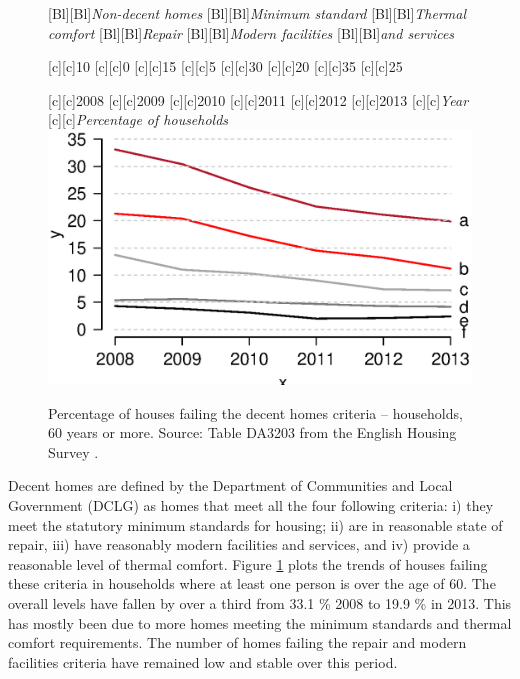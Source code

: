 \documentclass[11 pt, a4paper]{report}
\begin{document}
\begin{figure}[hbtp!]
[Bl][Bl]{\emph{Non-decent homes}}
[Bl][Bl]{\emph{Minimum standard}}
[Bl][Bl]{\emph{Thermal comfort}}
[Bl][Bl]{\emph{Repair}}
[Bl][Bl]{\emph{Modern facilities}}
[Bl][Bl]{\emph{and services}}

[c][c]{\small{10}}
[c][c]{\small{0}}
[c][c]{\small{15}}
[c][c]{\small{5}}
[c][c]{\small{30}}
[c][c]{\small{20}}
[c][c]{\small{35}}
[c][c]{\small{25}}

[c][c]{\small{2008}}
[c][c]{\small{2009}}
[c][c]{\small{2010}}
[c][c]{\small{2011}}
[c][c]{\small{2012}}
[c][c]{\small{2013}}
[c][c]{\small{\emph{Year}}}
[c][c]{\small{\emph{Percentage of households}}}
\includegraphics[width=\textwidth]{../figures/Fig6.3.eps}
\caption{Percentage of houses failing the decent homes criteria – households, 60 years or more. Source: Table DA3203 from the English Housing Survey \citep{DCLG2013}.}\label{Fig:18} %
\end{figure}

Decent homes are defined by the Department of Communities and Local Government (DCLG) as homes that meet all the four following criteria: i) they meet the statutory minimum standards for housing; ii) are in reasonable state of repair, iii) have reasonably modern facilities and services, and iv) provide a reasonable level of thermal comfort. Figure \ref{Fig:18} plots the trends of houses failing these criteria in households where at least one person is over the age of 60. The overall levels have fallen by over a third from 33.1 \% 2008 to 19.9 \% in 2013. This has mostly been due to more homes meeting the minimum standards and thermal comfort requirements. The number of homes failing the repair and modern facilities criteria have remained low and stable over this period. 
\end{document}
